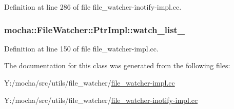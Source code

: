 Definition at line 286 of file file\_\-watcher-\/inotify-\/impl.cc.

\hypertarget{classmocha_1_1_file_watcher_1_1_ptr_impl_aa51062c0d8ee6c367c2c1372d676d8c1}{
\subsubsection[{watch\_\-list\_\-}]{ {\bf mocha::FileWatcher::PtrImpl::watch\_\-list\_\-}}}
\label{classmocha_1_1_file_watcher_1_1_ptr_impl_aa51062c0d8ee6c367c2c1372d676d8c1}


Definition at line 150 of file file\_\-watcher-\/impl.cc.



The documentation for this class was generated from the following files:\begin{DoxyCompactItemize}
\item 
Y:/mocha/src/utils/file\_\-watcher/\hyperlink{file__watcher-impl_8cc}{file\_\-watcher-\/impl.cc}\item 
Y:/mocha/src/utils/file\_\-watcher/\hyperlink{file__watcher-inotify-impl_8cc}{file\_\-watcher-\/inotify-\/impl.cc}\end{DoxyCompactItemize}
